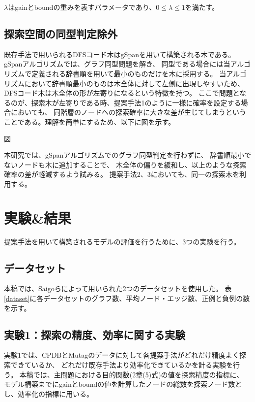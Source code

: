 $\lambda$はgainとboundの重みを表すパラメータであり、$0 \leq \lambda \leq 1$を満たす。

\subsection{探索空間の同型判定除外}
既存手法で用いられるDFSコード木はgSpan\cite{gSpan}を用いて構築される木である。
gSpanアルゴリズムでは、グラフ同型問題を解き、
同型である場合には当アルゴリズムで定義される辞書順を用いて最小のものだけを木に採用する。
当アルゴリズムにおいて辞書順最小のものは木全体に対して左側に出現しやすいため、
DFSコード木は木全体の形が左寄りになるという特徴を持つ。
ここで問題となるのが、探索木が左寄りである時、提案手法1のように一様に確率を設定する場合においても、
同階層のノードへの探索確率に大きな差が生じてしまうということである。理解を簡単にするため、以下に図を示す。

図

本研究では、gSpanアルゴリズムでのグラフ同型判定を行わずに、
辞書順最小でないノードも木に追加することで、
木全体の偏りを緩和し、以上のような探索確率の差が軽減するよう試みる。
提案手法2、3においても、同一の探索木を利用する。


\section{実験\&結果}
提案手法を用いて構築されるモデルの評価を行うために、3つの実験を行う。

\subsection{データセット}
\begin{table}
	\centering
	\caption{使用したデータセット}
	\label{dataset}
\end{table}

本稿では、Saigoら\cite{gBoost}によって用いられた2つのデータセットを使用した。
表\ref{dataset}に各データセットのグラフ数、平均ノード・エッジ数、正例と負例の数を示す。

\subsection{実験1：探索の精度、効率に関する実験}
実験1では、CPDBとMutagのデータに対して各提案手法がどれだけ精度よく探索できているか、
どれだけ既存手法より効率化できているかを計る実験を行う。
本稿では、主問題における目的関数(2章(5)式)の値を探索精度の指標に、
モデル構築までにgainとboundの値を計算したノードの総数を探索ノード数とし、効率化の指標に用いる。

